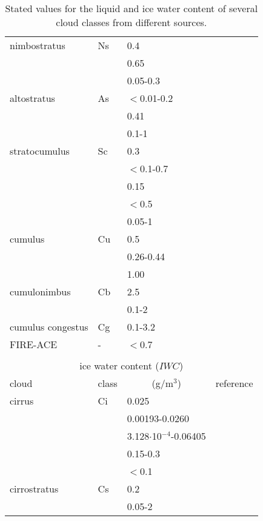 {\begin{table}[!htb]
\begin{center}
\begin{tabular}{llll}
 nimbostratus & Ns    & 0.4         & \cite{salby:96}\\
              &       & 0.65        & \cite{abreu:96}\\
              &       & 0.05-0.3    & \cite{berton:00}\\
 altostratus  & As    & $<$0.01-0.2 & \cite{seinfeld:98}\\
              &       & 0.41        & \cite{abreu:96}\\
              &       & 0.1-1       & \cite{berton:00}\\
 stratocumulus& Sc    & 0.3         & \cite{salby:96}\\
              &       & $<$0.1-0.7  & \cite{seinfeld:98}\\
              &       & 0.15        & \cite{abreu:96}\\
              &       & $<$0.5      & \cite{pawlowskaetal:00}\\
              &       & 0.05-1      & \cite{berton:00}\\
 cumulus      & Cu    & 0.5         & \cite{salby:96}\\
              &       & 0.26-0.44   & \cite{hess:98}\\
              &       & 1.00        & \cite{abreu:96}\\
 cumulonimbus & Cb    & 2.5         & \cite{salby:96}\\
              &       & 0.1-2       & \cite{berton:00}\\
 cumulus 
    congestus & Cg    & 0.1-3.2     & \cite{berton:00}\\
FIRE-ACE      & -     & $<$0.7      & \cite{shupeetal:00}\\
\hline
\multicolumn{4}{c}{}  \\
\multicolumn{4}{c}{ice water content ($IWC$)}  \\
 cloud        & class & \multicolumn{1}{c}{(g/m$^3$)} & reference\\
\hline
 cirrus       & Ci    & 0.025                         & \cite{salby:96}\\
              &       & 0.00193-0.0260                & \cite{hess:98}\\
              &       & 3.128$\cdot$10$^{-4}$-0.06405 & \cite{abreu:96}\\ 
              &       & 0.15-0.3                      & \cite{larsenetal:98}\\
              &       & $<$0.1                        & \cite{berton:00}\\
cirrostratus  & Cs    & 0.2                           & \cite{salby:96}\\
              &       & 0.05-2                        & \cite{berton:00}\\
\hline
\end{tabular}
\caption{Stated values for the liquid and ice water content of several 
  cloud classes from different sources.}
\label{tab:lwc}
\end{center}
\end{table}



}
